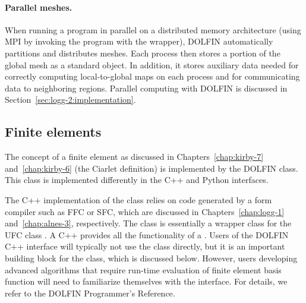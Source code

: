 \paragraph{Parallel meshes.}

When running a program in parallel on a distributed memory architecture
(using MPI by invoking the program with the  wrapper),
DOLFIN automatically partitions and distributes meshes. Each process
then stores a portion of the global mesh as a standard 
object. In addition, it stores auxiliary data needed for correctly
computing local-to-global maps on each process and for communicating
data to neighboring regions. Parallel computing with DOLFIN is discussed
in Section~\ref{sec:logg-2:implementation}.

\subsection{Finite elements}

The concept of a finite element as discussed in
Chapters~\ref{chap:kirby-7} and~\ref{chap:kirby-6} (the Ciarlet
definition) is implemented by the DOLFIN  class. This
class is implemented differently in the C++ and Python interfaces.

The C++ implementation of the  class relies on
code generated by a form compiler such as FFC or SFC, which are discussed
in Chapters~\ref{chap:logg-1} and~\ref{chap:alnes-3}, respectively. The
class  is essentially a wrapper class for the UFC class
. A C++  provides all
the functionality of a . Users of the DOLFIN C++
interface will typically not use the  class directly,
but it is an important building block for the  class, which
is discussed below. However, users developing advanced algorithms that
require run-time evaluation of finite element basis function will need
to familiarize themselves with the  interface. For
details, we refer to the DOLFIN Programmer's Reference.

